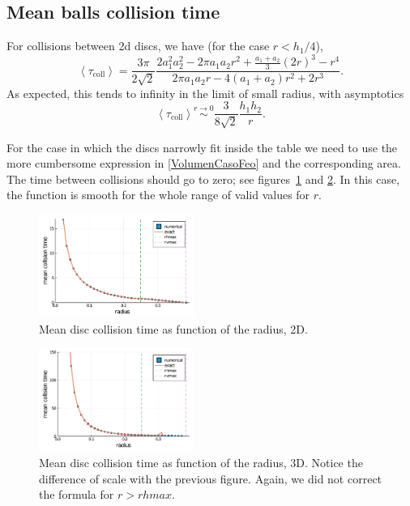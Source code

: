 \documentclass[superscriptaddress,pre,reprint,showpacs,twocolumn]{revtex4-1}
\newcommand{\mean}[1]{\left \langle #1 \right \rangle}
\begin{document}
\subsection{Mean balls collision time}

For collisions between 2d discs, we have (for the case $r < h_1/4$),
\begin{equation}\label{colltau}
 \mean{\tau_\text{coll}} = 	
\frac{3 \pi}{2\sqrt{2}}
\frac {2 a_1^2 a_2^2  - 2 \pi a_1 a_2 r^{2} + \textstyle \frac{a_1+a_2}{3}  (2r)^{3}
  -  r^4}
{2\pi a_1 a_2 r -4(a_1+a_2)r^2+2r^3}.
\end{equation}
As expected, this tends to infinity in the limit of small radius, with asymptotics
\begin{equation}\label{colltaulim0}
\mean{\tau_\text{coll}} \overset{r \to 0}{\sim}
\frac{3}{8\sqrt{2}}\frac{h_1h_2}{r}.
\end{equation}

For the case in which the discs narrowly fit inside the table we need to
use the more cumbersome expression in \eqref{VolumenCasoFeo} and
the corresponding area. The time between collisions should go to zero; 
see figures~\ref{meancol2d}  and \ref{meancol3d}.
In this case, the function is smooth for the whole
range of valid values for $r$.

\begin{figure}[h]
  \centering
  \includegraphics[width=0.45\textwidth]{figures/collisions2d.pdf}
  \caption{Mean disc collision time as function of the radius, 2D. }\label{meancol2d}
\end{figure}


\begin{figure}[h]
  \centering
  \includegraphics[width=0.45\textwidth]{figures/collisions3d.pdf}
  \caption{Mean disc collision time as function of the radius, 3D.
    Notice the difference of scale with the previous figure.
  Again, we did not correct the formula for $r>rhmax$.}\label{meancol3d}
\end{figure}
\end{document}
